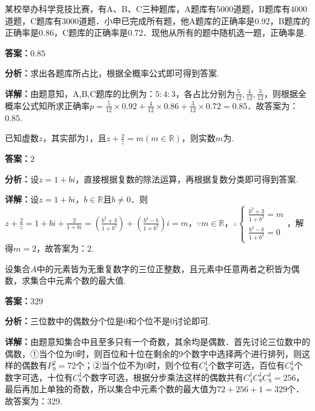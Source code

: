\begin{question}[points=5]
某校举办科学竞技比赛，有A、B、C三种题库，A题库有5000道题，B题库有4000道题，C题库有3000道题．小申已完成所有题，他A题库的正确率是0.92，B题库的正确率是0.86，C题库的正确率是0.72．现他从所有的题中随机选一题，正确率是.
\fillin[{$0.85$}]
\begin{solution}
\textbf{答案：}$0.85$

\textbf{分析：}求出各题库所占比，根据全概率公式即可得到答案.

\textbf{详解：}由题意知，A,B,C题库的比例为：$5:4:3$，各占比分别为$\frac{5}{12},\frac{4}{12},\frac{3}{12}$，则根据全概率公式知所求正确率$p=\frac{5}{12}\times0.92+\frac{4}{12}\times0.86+\frac{3}{12}\times0.72=0.85$．故答案为：0.85.
\end{solution}
\end{question}

\begin{question}[points=5]
已知虚数$z$，其实部为1，且$z+\frac{2}{z}=m(m\in\mathbb{R})$，则实数$m$为.
\fillin[{$2$}]
\begin{solution}
\textbf{答案：}$2$

\textbf{分析：}设$z=1+bi$，直接根据复数的除法运算，再根据复数分类即可得到答案.

\textbf{详解：}设$z=1+bi$，$b\in\mathbb{R}$且$b\neq0$．则$z+\frac{2}{z}=1+bi+\frac{2}{1+bi}=\left(\frac{b^2+3}{1+b^2}\right)+\left(\frac{b^3-b}{1+b^2}\right)i=m$，$\because m\in\mathbb{R}$，$\therefore \begin{cases} \frac{b^2+3}{1+b^2}=m \\ \frac{b^3-b}{1+b^2}=0 \end{cases}$，解得$m=2$，故答案为：2.
\end{solution}
\end{question}

\begin{question}[points=5]
设集合$A$中的元素皆为无重复数字的三位正整数，且元素中任意两者之积皆为偶数，求集合中元素个数的最大值.
\fillin[{$329$}]
\begin{solution}
\textbf{答案：}$329$

\textbf{分析：}三位数中的偶数分个位是0和个位不是0讨论即可.

\textbf{详解：}由题意知集合中且至多只有一个奇数，其余均是偶数．首先讨论三位数中的偶数，①当个位为0时，则百位和十位在剩余的9个数字中选择两个进行排列，则这样的偶数有$P_9^2=72$个；②当个位不为0时，则个位有$C_4^1$个数字可选，百位有$C_8^1$个数字可选，十位有$C_8^1$个数字可选，根据分步乘法这样的偶数共有$C_4^1C_8^1C_8^1=256$，最后再加上单独的奇数，所以集合中元素个数的最大值为$72+256+1=329$个．故答案为：329.
\end{solution}
\end{question}

